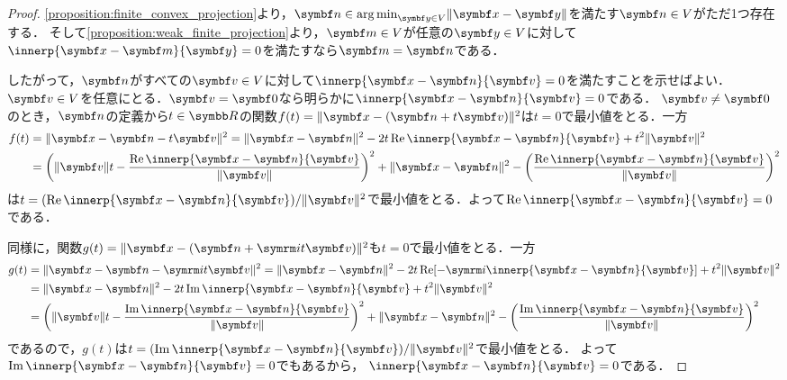 \documentclass[../../main]{subfiles}
\begin{document}
\begin{proof}
  \cref{proposition:finite_convex_projection}より，\(\vect{n}\in\argmin_{\vect{y}\in V}\vnorm{\vect{x}-\vect{y}}\)を満たす\(\vect{n}\in V\)がただ1つ存在する．
  そして\cref{proposition:weak_finite_projection}より，\(\vect{m}\in V\)が任意の\(\vect{y}\in V\)に対して\(\innerp{\vect{x}-\vect{m}}{\vect{y}}=0\)を満たすなら\(\vect{m}=\vect{n}\)である．

  したがって，\(\vect{n}\)がすべての\(\vect{v}\in V\)に対して\(\innerp{\vect{x}-\vect{n}}{\vect{v}}=0\)を満たすことを示せばよい．
  \(\vect{v}\in V\)を任意にとる．\(\vect{v}=\vect{0}\)なら明らかに\(\innerp{\vect{x}-\vect{n}}{\vect{v}}=0\)である．
  \(\vect{v}\neq\vect{0}\)のとき，\(\vect{n}\)の定義から\(t\in\numset{R}\)の関数\(f(t)=\vnorm{\vect{x}-(\vect{n}+t\vect{v})}^2\)は\(t=0\)で最小値をとる．一方
  \begin{align*}
    f(t) &= \vnorm{\vect{x}-\vect{n}-t\vect{v}}^2 = \vnorm{\vect{x}-\vect{n}}^2-2t\rpart\innerp{\vect{x}-\vect{n}}{\vect{v}}+t^2\vnorm{\vect{v}}^2 \\
    &= \pqty*{\vnorm{\vect{v}}t-\frac{\rpart\innerp{\vect{x}-\vect{n}}{\vect{v}}}{\vnorm{\vect{v}}}}^2+\vnorm{\vect{x}-\vect{n}}^2-\pqty*{\frac{\rpart\innerp{\vect{x}-\vect{n}}{\vect{v}}}{\vnorm{\vect{v}}}}^2
  \end{align*}
  は\(t=(\rpart\innerp{\vect{x}-\vect{n}}{\vect{v}})/\vnorm{\vect{v}}^2\)で最小値をとる．よって\(\rpart\innerp{\vect{x}-\vect{n}}{\vect{v}}=0\)である．

  同様に，関数\(g(t)=\vnorm{\vect{x}-(\vect{n}+\iuni t\vect{v})}^2\)も\(t=0\)で最小値をとる．一方
  \begin{align*}
    g(t) &= \vnorm{\vect{x}-\vect{n}-\iuni t\vect{v}}^2 = \vnorm{\vect{x}-\vect{n}}^2-2t\rpart[-\iuni\innerp{\vect{x}-\vect{n}}{\vect{v}}]+t^2\vnorm{\vect{v}}^2 \\
    &= \vnorm{\vect{x}-\vect{n}}^2-2t\ipart\innerp{\vect{x}-\vect{n}}{\vect{v}}+t^2\vnorm{\vect{v}}^2 \\
    &= \pqty*{\vnorm{\vect{v}}t-\frac{\ipart\innerp{\vect{x}-\vect{n}}{\vect{v}}}{\vnorm{\vect{v}}}}^2+\vnorm{\vect{x}-\vect{n}}^2-\pqty*{\frac{\ipart\innerp{\vect{x}-\vect{n}}{\vect{v}}}{\vnorm{\vect{v}}}}^2
  \end{align*}
  であるので，\(g(t)\)は\(t=(\ipart\innerp{\vect{x}-\vect{n}}{\vect{v}})/\vnorm{\vect{v}}^2\)で最小値をとる．
  よって\(\ipart\innerp{\vect{x}-\vect{n}}{\vect{v}}=0\)でもあるから，
  \(\innerp{\vect{x}-\vect{n}}{\vect{v}}=0\)である．
\end{proof}
\end{document}
